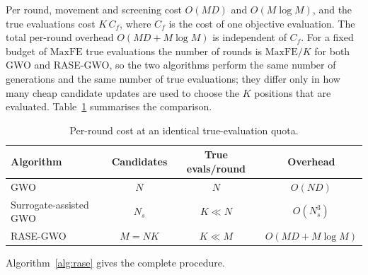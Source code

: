 Per round, movement and screening cost $O(MD)$ and $O(M\log M)$, and the true
evaluations cost $K\,C_f$, where $C_f$ is the cost of one objective evaluation.
The total per-round overhead $O(MD + M\log M)$ is independent of $C_f$. For a
fixed budget of $\mathrm{MaxFE}$ true evaluations the number of rounds is
$\mathrm{MaxFE}/K$ for both GWO and RASE-GWO, so the two algorithms perform the
same number of generations and the same number of true evaluations; they differ
only in how many cheap candidate updates are used to choose the $K$ positions
that are evaluated. Table~\ref{tab:complexity} summarises the comparison.

\begin{table}[t]
\centering
\caption{Per-round cost at an identical true-evaluation quota.}
\label{tab:complexity}
\begin{tabular}{lccc}
\toprule
Algorithm & Candidates & True evals/round & Overhead \\
\midrule
GWO & $N$ & $N$ & $O(ND)$ \\
Surrogate-assisted GWO & $N_s$ & $K \ll N$ & $O(N_s^3)$ \\
RASE-GWO & $M=NK$ & $K \ll M$ & $O(MD + M\log M)$ \\
\bottomrule
\end{tabular}
\end{table}

Algorithm~\ref{alg:rase} gives the complete procedure.

